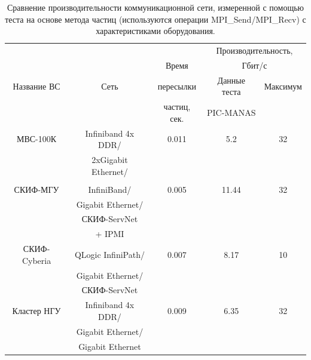 \begin{table}[ht]
	\caption{Сравнение производительности коммуникационной сети, измеренной с помощью теста на основе метода частиц (используются операции MPI\_Send/MPI\_Recv) с характеристиками оборудования.}
	\label{tab_net_gb_sec}
	\begin{tabular}{|c|c|c|c|c|}
		\hline
		             &                     &        &    \multicolumn{2}{|c|}{Производительность,} \\ 
		             &                     & Время            &    \multicolumn{2}{|c|}{Гбит/с} \\ \cline{4-5}              
		Название ВС  & Сеть                & пересылки   & Данные теста       & Максимум  \\
		             &                     & частиц, сек.&   PIC-MANAS        &           \\  \hline
		МВС-100К     &  Infiniband 4x DDR/ &  0.011           &     5.2           & 32       \\ 
		             &  2xGigabit Ethernet/&             &                    &          \\
		             &                     &             &                    &          \\ \hline  
		СКИФ-МГУ     & InfiniBand/         &  0.005           &     11.44          & 32       \\   
		             &  Gigabit Ethernet/  &              &                    &          \\
		             &  СКИФ-ServNet       &              &                    &          \\   
		             &   + IPMI            &             &                     &          \\ \hline  
		СКИФ-Cyberia &  QLogic InfiniPath/ &  0.007           &      8.17              & 10    \\ 
		             &  Gigabit Ethernet/  &             &                    &          \\
		             &  СКИФ-ServNet       &             &                    &          \\ \hline
		Кластер НГУ  & Infiniband 4x DDR/  &  0.009        &     6.35           & 32       \\ 
		             &   Gigabit Ethernet/ &           &                    &          \\
		             &   Gigabit Ethernet  &           &                    &          \\ \hline
	\end{tabular}	
\end{table}

